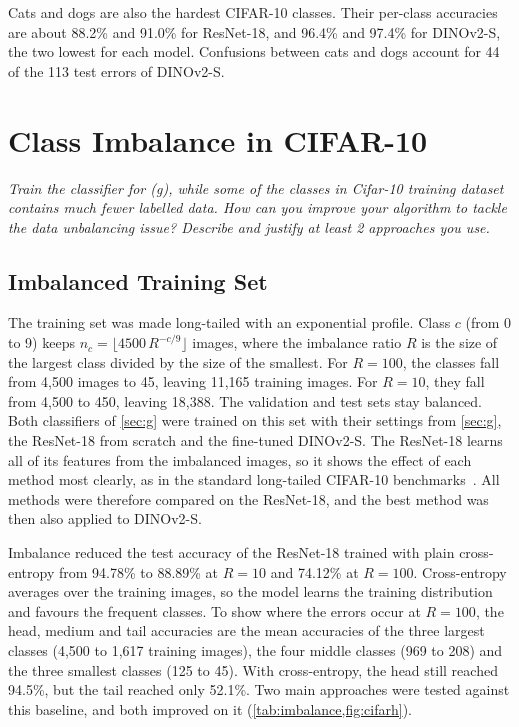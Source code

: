 \documentclass[11pt,a4paper]{article}
\newenvironment{question}
  {\par\smallskip\noindent\begin{lrbox}{\questionbox}%
   \begin{minipage}{\dimexpr\linewidth-2\fboxsep-2\fboxrule\relax}\small\itshape}
  {\end{minipage}\end{lrbox}%
   \fcolorbox{gray!45}{gray!7}{\usebox{\questionbox}}\par\smallskip}
\newcommand{\pct}[1]{#1\%}
\begin{document}
Cats and dogs are also the hardest CIFAR-10 classes. Their per-class accuracies are about \pct{88.2} and \pct{91.0} for ResNet-18, and \pct{96.4} and \pct{97.4} for DINOv2-S, the two lowest for each model. Confusions between cats and dogs account for 44 of the 113 test errors of DINOv2-S.

\section{Class Imbalance in CIFAR-10}\label{sec:h}

\begin{question}
Train the classifier for (g), while some of the classes in Cifar-10 training dataset contains much fewer labelled data. How can you improve your algorithm to tackle the data unbalancing issue? Describe and justify at least 2 approaches you use.
\end{question}

\subsection*{Imbalanced Training Set}

The training set was made long-tailed with an exponential profile. Class $c$ (from 0 to 9) keeps $n_c = \lfloor 4500 \, R^{-c/9} \rfloor$ images, where the imbalance ratio $R$ is the size of the largest class divided by the size of the smallest. For $R = 100$, the classes fall from 4,500 images to 45, leaving 11,165 training images. For $R = 10$, they fall from 4,500 to 450, leaving 18,388. The validation and test sets stay balanced. Both classifiers of \cref{sec:g} were trained on this set with their settings from \cref{sec:g}, the ResNet-18 from scratch and the fine-tuned DINOv2-S. The ResNet-18 learns all of its features from the imbalanced images, so it shows the effect of each method most clearly, as in the standard long-tailed CIFAR-10 benchmarks~\cite{cao2019ldam,menon2021logitadjustment}. All methods were therefore compared on the ResNet-18, and the best method was then also applied to DINOv2-S.

Imbalance reduced the test accuracy of the ResNet-18 trained with plain cross-entropy from \pct{94.78} to \pct{88.89} at $R = 10$ and \pct{74.12} at $R = 100$. Cross-entropy averages over the training images, so the model learns the training distribution and favours the frequent classes. To show where the errors occur at $R = 100$, the head, medium and tail accuracies are the mean accuracies of the three largest classes (4,500 to 1,617 training images), the four middle classes (969 to 208) and the three smallest classes (125 to 45). With cross-entropy, the head still reached \pct{94.5}, but the tail reached only \pct{52.1}. Two main approaches were tested against this baseline, and both improved on it (\cref{tab:imbalance,fig:cifarh}).
\end{document}

